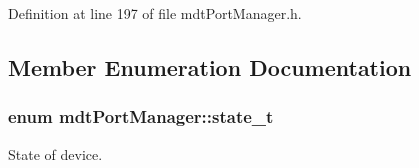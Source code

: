 Definition at line 197 of file mdtPortManager.h.



\subsection{Member Enumeration Documentation}
\hypertarget{classmdt_port_manager_a9448339d7f08ca5e18b904df25b382da}{
\subsubsection[{state\_\-t}]{\setlength{\rightskip}{0pt plus 5cm}enum {\bf mdtPortManager::state\_\-t}}}
\label{classmdt_port_manager_a9448339d7f08ca5e18b904df25b382da}


State of device. 


